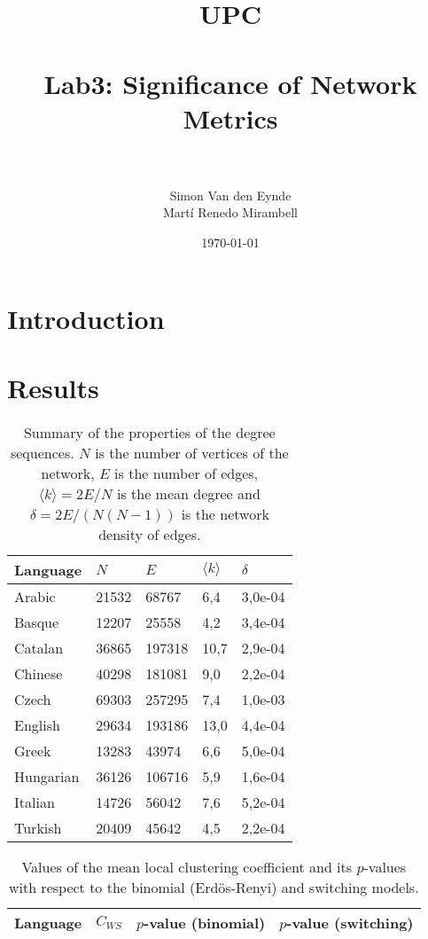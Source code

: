 \documentclass[paper=a4, fontsize=11pt]{scrartcl} %
\title{	
\normalfont \normalsize 
\textsc{UPC} \\ [25pt] %
\horrule{0.5pt} \\[0.4cm] %
\huge Lab3: Significance of Network Metrics \\ %
\horrule{2pt} \\[0.5cm] %
}
\author{Simon Van den Eynde\\ Martí Renedo Mirambell} %
\date{\normalsize\today} %
\begin{document}
\maketitle %



\section{Introduction}


\section{Results}






\begin{table}[]
\centering
\caption{Summary of the properties of the degree sequences. $N$ is the number of vertices of the network, $E$ is the number of edges, $\langle k\rangle=2E/N$ is the mean degree and $\delta=2E/(N(N-1))$ is the network density of edges.}
\label{table1l}
\begin{tabular}{l|llll}
Language	& $N$		& $E$		& $\langle k\rangle$	& $\delta$ \\ \hline
Arabic 	& 21532	&  68767 	&  6,4 			& 3,0e-04 \\ 
Basque  	& 12207 	& 25558   	& 4,2  			& 3,4e-04 \\
Catalan  	& 36865 	& 197318 	& 10,7 			& 2,9e-04 \\
Chinese 	&40298 	& 181081 	&  9,0 			& 2,2e-04 \\
Czech 	& 69303	& 257295 	& 7,4 				& 1,0e-03 \\
English 	& 29634 	& 193186  	& 13,0 			& 4,4e-04 \\
Greek  	& 13283  	& 43974  	&  6,6  			& 5,0e-04 \\
Hungarian  	& 36126 	& 106716  	& 5,9  			& 1,6e-04 \\
Italian  	& 14726  	& 56042   	& 7,6  			& 5,2e-04 \\
Turkish  	& 20409  	& 45642  	& 4,5 				& 2,2e-04
\end{tabular}
\end{table}


\begin{table}
\centering
\caption{Values of the mean local clustering coefficient and its $p$-values with respect to the binomial (Erdös-Renyi) and switching models.}
\label{table2}
\begin{tabular}{l|lll}
Language		& $C_{WS}$		& $p$-value (binomial) 	& $p$-value (switching) \\ \hline

\end{tabular}
\end{table}
\end{document}
